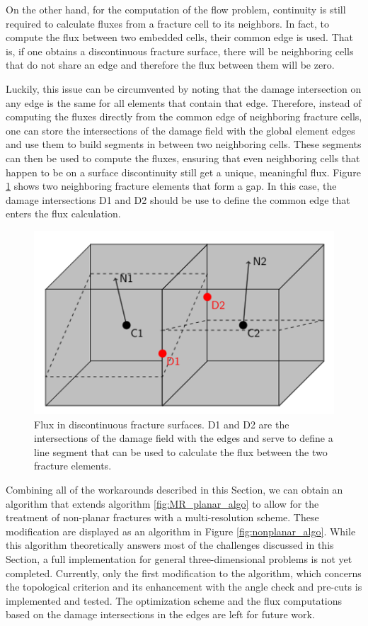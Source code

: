 On the other hand, for the computation of the flow problem, continuity is still required to calculate fluxes from a fracture cell to its neighbors. In fact, to compute the flux between two embedded cells, their common edge is used. That is, if one obtains a discontinuous fracture surface, there will be neighboring cells that do not share an edge and therefore the flux between them will be zero.

Luckily, this issue can be circumvented by noting that the damage intersection on any edge is the same for all elements that contain that edge. Therefore, instead of computing the fluxes directly from the common edge of neighboring fracture cells, one can store the intersections of the damage field with the global element edges and use them to build segments in between two neighboring cells. These segments can then be used to compute the fluxes, ensuring that even neighboring cells that happen to be on a surface discontinuity still get a unique, meaningful flux. Figure \ref{fig:flux_calculations} shows two neighboring fracture elements that form a gap. In this case, the damage intersections D1 and D2 should be use to define the common edge that enters the flux calculation.

\begin{figure}[h]
    \centering
    \includegraphics[width=0.6\linewidth]{Chapter4/figures/nonplanar/nonplanar_flux.png}
    \caption{Flux in discontinuous fracture surfaces. D1 and D2 are the intersections of the damage field with the edges and serve to define a line segment that can be used to calculate the flux between the two fracture elements.}
    \label{fig:flux_calculations}
\end{figure}

Combining all of the workarounds described in this Section, we can obtain an algorithm that extends algorithm \ref{fig:MR_planar_algo} to allow for the treatment of non-planar fractures with a multi-resolution scheme. These modification are displayed as an algorithm in Figure \ref{fig:nonplanar_algo}.
While this algorithm theoretically answers most of the challenges discussed in this Section, a full implementation for general three-dimensional problems is not yet completed. Currently, only the first modification to the algorithm, which concerns the topological criterion and its enhancement with the angle check and pre-cuts is implemented and tested. The optimization scheme and the flux computations based on the damage intersections in the edges are left for future work. 

